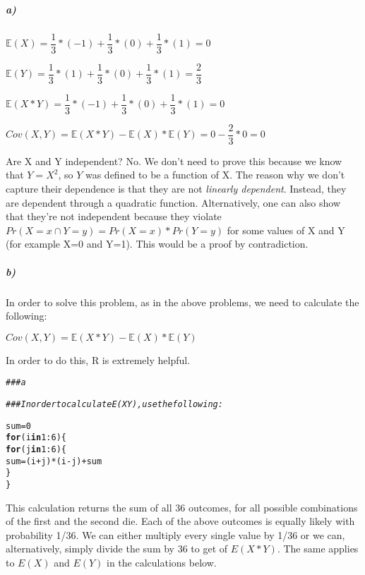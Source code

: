 \documentclass[12pt,letter]{article}\usepackage[]{graphicx}\usepackage[]{color}
\makeatletter
\newcommand{\hlnum}[1]{\textcolor[rgb]{0.686,0.059,0.569}{#1}}%
\newcommand{\hlcom}[1]{\textcolor[rgb]{0.678,0.584,0.686}{\textit{#1}}}%
\newcommand{\hlopt}[1]{\textcolor[rgb]{0,0,0}{#1}}%
\newcommand{\hlstd}[1]{\textcolor[rgb]{0.345,0.345,0.345}{#1}}%
\newcommand{\hlkwa}[1]{\textcolor[rgb]{0.161,0.373,0.58}{\textbf{#1}}}%
\newcommand{\hlkwb}[1]{\textcolor[rgb]{0.69,0.353,0.396}{#1}}%
\newenvironment{kframe}{%
 \def\at@end@of@kframe{}%
 \ifinner\ifhmode%
  \def\at@end@of@kframe{\end{minipage}}%
  \begin{minipage}{\columnwidth}%
 \fi\fi%
 \def\FrameCommand##1{\hskip\@totalleftmargin \hskip-\fboxsep
 \colorbox{shadecolor}{##1}\hskip-\fboxsep
     \hskip-\linewidth \hskip-\@totalleftmargin \hskip\columnwidth}%
 \MakeFramed {\advance\hsize-\width
   \@totalleftmargin\z@ \linewidth\hsize
   \@setminipage}}%
 {\par\unskip\endMakeFramed%
 \at@end@of@kframe}
\newenvironment{knitrout}{}{} %
\makeatother
\begin{document}
\subparagraph{a)} $\mathbb{E}(X) = \dfrac{1}{3}*(-1) + \dfrac{1}{3}*(0) + \dfrac{1}{3}*(1) = 0$

$\mathbb{E}(Y) = \dfrac{1}{3}*(1) + \dfrac{1}{3}*(0) + \dfrac{1}{3}*(1) = \dfrac{2}{3}$

$\mathbb{E}(X*Y) = \dfrac{1}{3}*(-1) + \dfrac{1}{3}*(0) + \dfrac{1}{3}*(1) = 0$

$Cov (X, Y) = \mathbb{E}(X*Y) - \mathbb{E}(X)*\mathbb{E}(Y) = 0 - \dfrac{2}{3} * 0 = 0$

Are X and Y independent? No. We don't need to prove this because we know that $Y=X^2$, so $Y$ was defined to be a function of X. The reason why we don't capture their dependence is that they are not \textit{linearly dependent}. Instead, they are dependent through a quadratic function. Alternatively, one can also show that they're not independent because they violate $Pr (X=x \cap Y=y) = Pr(X=x)*Pr(Y=y)$ for some values of X and Y (for example X=0 and Y=1). This would be a proof by contradiction.

\subparagraph{b)} In order to solve this problem, as in the above problems, we need to calculate the following:

$Cov(X, Y) = \mathbb{E}(X*Y)-\mathbb{E}(X)*\mathbb{E}(Y)$

In order to do this, R is extremely helpful.

\begin{knitrout}
\color{fgcolor}\begin{kframe}
\begin{alltt}
\hlcom{### a}

\hlcom{### In order to calculate E(XY), use the following:}

\hlstd{sum} \hlkwb{=} \hlnum{0}
\hlkwa{for} \hlstd{(i} \hlkwa{in} \hlnum{1}\hlopt{:}\hlnum{6}\hlstd{) \{}
    \hlkwa{for} \hlstd{(j} \hlkwa{in} \hlnum{1}\hlopt{:}\hlnum{6}\hlstd{) \{}
        \hlstd{sum} \hlkwb{=} \hlstd{(i} \hlopt{+} \hlstd{j)} \hlopt{*} \hlstd{(i} \hlopt{-} \hlstd{j)} \hlopt{+} \hlstd{sum}
    \hlstd{\}}
\hlstd{\}}
\end{alltt}
\end{kframe}
\end{knitrout}

This calculation returns the sum of all 36 outcomes, for all possible combinations of the first and the second die. Each of the above outcomes is equally likely with probability 1/36. We can either multiply every single value by 1/36 or we can, alternatively, simply divide the sum by 36 to get of $E(X*Y)$. The same applies to $E(X)$ and $E(Y)$ in the calculations below.
\end{document}
